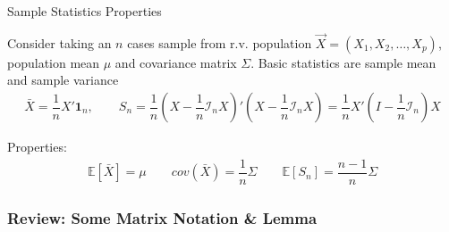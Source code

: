 \begin{point}
    \hypertarget{SampleStatisticsProperties}{Sample Statistics Properties}
\end{point}

    Consider taking an $ n $ cases sample from r.v. population $ \vec{X}=(X_1,X_2,\ldots,X_p) $, population mean $ \mu $ and covariance matrix $ \Sigma  $. Basic statistics are sample mean and sample variance
    \begin{align}
        \bar{X}=\dfrac{1}{n}X'\mathbf{1}_n, \qquad  S_n=\dfrac{1}{n}\left(X-\dfrac{1}{n}\mathcal{I}_nX\right)'\left(X-\dfrac{1}{n}\mathcal{I}_nX\right)=\dfrac{1}{n}X'\left(I-\dfrac{1}{n}\mathcal{I}_n\right)X
    \end{align}

    Properties:
\begin{align}
     \mathbb{E}\left[ \bar{X} \right] = \mu \qquad cov(\bar{X})=\dfrac{1}{n}\Sigma \qquad \mathbb{E}\left[ S_n \right] = \dfrac{n-1}{n}\Sigma 
\end{align}


    
        


\subsubsection{Review: Some Matrix Notation \& Lemma}\label{SubSubSectionMatrixNotationAndLemma}

